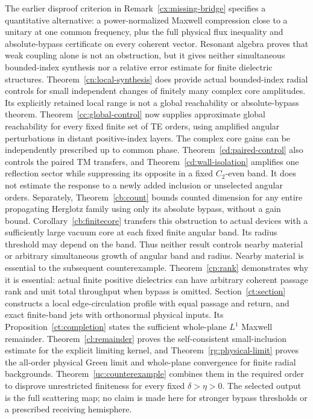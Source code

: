 The earlier disproof criterion in Remark~\ref{cx:missing-bridge} specifies a quantitative
alternative: a power-normalized Maxwell compression close to a unitary
at one common frequency, plus the full physical flux inequality and
absolute-bypass certificate on every coherent vector. Resonant algebra
proves that weak coupling alone is not an obstruction, but it gives
neither simultaneous bounded-index synthesis nor a relative error
estimate for finite dielectric structures.
Theorem~\ref{cn:local-synthesis} does provide actual bounded-index
radial controls for small independent changes of finitely many complex
core amplitudes. Its explicitly retained local range is not a global
reachability or absolute-bypass theorem.
Theorem~\ref{cc:global-control} now supplies approximate global
reachability for every fixed finite set of TE orders, using amplified
angular perturbations in distant positive-index layers. The complex core
gains can be independently prescribed up to common phase.
Theorem~\ref{cd:paired-control} also controls the paired TM transfers,
and Theorem~\ref{cd:wall-isolation} amplifies one reflection sector while
suppressing its opposite in a fixed $C_2$-even band. It does not estimate
the response to a newly added inclusion or unselected angular orders.
Separately,
Theorem~\ref{cb:count} bounds counted dimension for any entire propagating
Herglotz family using only its absolute bypass, without a gain bound.
Corollary~\ref{cb:finitecore} transfers this obstruction to actual devices
with a sufficiently large vacuum core at each fixed finite angular band.
Its radius threshold may depend on the band. Thus neither result controls
nearby material or arbitrary simultaneous growth of angular band and
radius. Nearby material is essential to the subsequent counterexample.
Theorem~\ref{cp:rank} demonstrates why it is essential: actual
finite positive dielectrics can have arbitrary coherent passage rank
and unit total throughput when bypass is omitted. Section~\ref{ct:section}
constructs a local edge-circulation profile with equal passage and return,
and exact finite-band jets with orthonormal physical inputs. Its
Proposition~\ref{ct:completion} states the sufficient whole-plane $L^1$
Maxwell remainder. Theorem~\ref{cl:remainder} proves the self-consistent
small-inclusion estimate for the explicit limiting kernel, and
Theorem~\ref{rg:physical-limit} proves the all-order physical Green limit
and whole-plane convergence for finite radial backgrounds.
Theorem~\ref{uc:counterexample} combines them in the required order
to disprove unrestricted finiteness for every fixed $\delta>\eta>0$.
The selected output is the full scattering map; no claim is made here
for stronger bypass thresholds or a prescribed receiving hemisphere.

